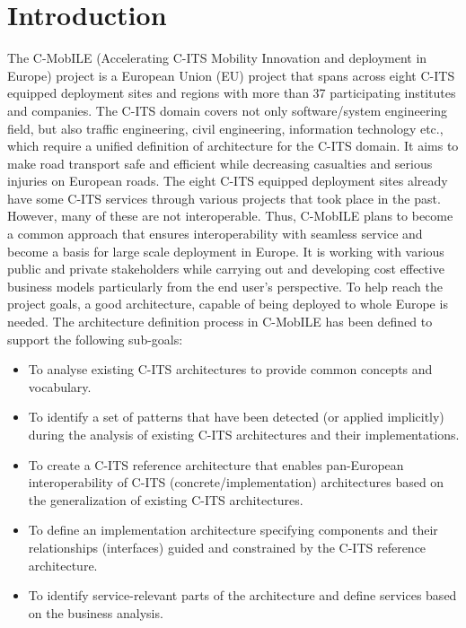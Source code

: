 \documentclass[conference]{IEEEtran}
\begin{document}
\section{Introduction}

The C-MobILE (Accelerating C-ITS Mobility Innovation and deployment in Europe) project is a European Union (EU) project that spans across eight C-ITS equipped deployment sites and regions with more than 37 participating institutes and companies. The C-ITS domain covers not only software/system engineering field, but also traffic engineering, civil engineering, information technology etc., which require a unified definition of architecture for the C-ITS domain. It aims to make road transport safe and efficient while decreasing casualties and serious injuries on European roads. The eight C-ITS equipped deployment sites already have some C-ITS services through various projects that took place in the past. However, many of these are not interoperable. Thus, C-MobILE plans to become a common approach that ensures interoperability with seamless service and become a basis for large scale deployment in Europe. It is working with various public and private stakeholders while carrying out and developing cost effective business models particularly from the end user’s perspective. To help reach the project goals, a good architecture, capable of being deployed to whole Europe is needed. The architecture definition process in C-MobILE has been defined to support the following sub-goals:

\begin{itemize}
	\item To analyse existing C-ITS architectures to provide common concepts and vocabulary.
	\item To identify a set of patterns that have been detected (or applied implicitly) during the analysis of existing C-ITS architectures and their implementations.
	\item To create a C-ITS reference architecture that enables pan-European interoperability of C-ITS (concrete/implementation) architectures based on the generalization of existing C-ITS architectures.
	\item To define an implementation architecture specifying components and their relationships (interfaces) guided and constrained by the C-ITS reference architecture.
	\item To identify service-relevant parts of the architecture and define services based on the business analysis.
\end{itemize}
 
\end{document}
